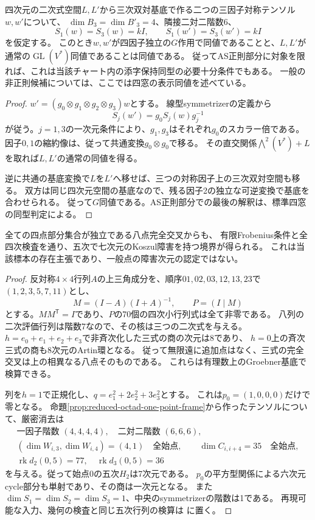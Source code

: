 \begin{proposition}[三因子対称チャートでの四因子同値判定]
\label{prop:partial-symmetric-orbit-congruence}
四次元の二次式空間$L,L'$から三次双対基底で作る二つの三因子対称テンソル$w,w'$について、
$\dim B_3=\dim B'_3=4$、隣接二対二階数6、
\[
 S_1(w)=S_3(w)=kI,\qquad S_1(w')=S_3(w')=kI
\]
を仮定する。
このとき$w,w'$が四因子独立の$G$作用で同値であることと、$L,L'$が通常の$\operatorname{GL}(V^*)$同値であることは同値である。
従ってAS正則部分に対象を限れば、これは当該チャート内の添字保持同型の必要十分条件でもある。
一般の非正則候補については、ここでは四窓の表示同値を述べている。
\end{proposition}
\begin{proof}
$w'=(g_0\otimes g_1\otimes g_2\otimes g_3)w$とする。
線型symmetrizerの定義から
\[
 S_j(w')=g_0S_j(w)g_j^{-1}
\]
が従う。$j=1,3$の一次元条件により、$g_1,g_3$はそれぞれ$g_0$のスカラー倍である。
因子$0,1$の縮約像は、従って共通変換$g_0\otimes g_0$で移る。
その直交関係$\bigwedge^2(V^*)+L$を取れば$L,L'$の通常の同値を得る。

逆に共通の基底変換で$L$を$L'$へ移せば、三つの対称因子上の三次双対空間も移る。
双方は同じ四次元空間の基底なので、残る因子2の独立な可逆変換で基底を合わせられる。
従って$G$同値である。AS正則部分での最後の解釈は、標準四窓の同型判定による。
\end{proof}

\begin{proposition}[一般位置八点でも生じる非Koszul標本]
\label{prop:general-position-octad-nonkoszul}
全ての四点部分集合が独立である八点完全交叉からも、
有限Frobenius条件と全四次検査を通り、五次で七次元のKoszul障害を持つ境界が得られる。
これは当該標本の存在主張であり、一般点の障害次元の認定ではない。
\end{proposition}
\begin{proof}
反対称$4\times4$行列$A$の上三角成分を、順序$01,02,03,12,13,23$で
$(1,2,3,5,7,11)$とし、
\[
 M=(I-A)(I+A)^{-1},\qquad P=(I\mid M)
\]
とする。$MM^{\mathsf T}=I$であり、$P$の70個の四次小行列式は全て非零である。
八列の二次評価行列は階数7なので、その核は三つの二次式を与える。
$h=e_0+e_1+e_2+e_3$で非斉次化した三式の商の次元は8であり、
$h=0$上の斉次三式の商も8次元のArtin環となる。
従って無限遠に追加点はなく、三式の完全交叉は上の相異なる八点そのものである。
これらは有理数上のGroebner基底で検算できる。

列を$h=1$で正規化し、$q=e_1^2+2e_2^2+3e_3^2$とする。
これは$p_0=(1,0,0,0)$だけで零となる。
命題\ref{prop:reduced-octad-one-point-frame}から作ったテンソルについて、厳密消去は
\[
\begin{gathered}
\text{一因子階数 }(4,4,4,4),\quad\text{二対二階数 }(6,6,6),\\
(\dim W_{i,3},\dim W_{i,4})=(4,1)\quad\text{全始点},\qquad
\dim C_{i,i+4}=35\quad\text{全始点},\\
\operatorname{rk}d_2(0,5)=77,\quad\operatorname{rk}d_3(0,5)=36
\end{gathered}
\]
を与える。従って始点0の五次$H_2$は7次元である。
$p_0$の平方型関係による六次元cycle部分も単射であり、その商は一次元となる。
また$\dim S_1=\dim S_2=\dim S_3=1$、中央のsymmetrizerの階数は1である。
再現可能な入力、幾何の検査と同じ五次行列の検算は
に置く。
\end{proof}

